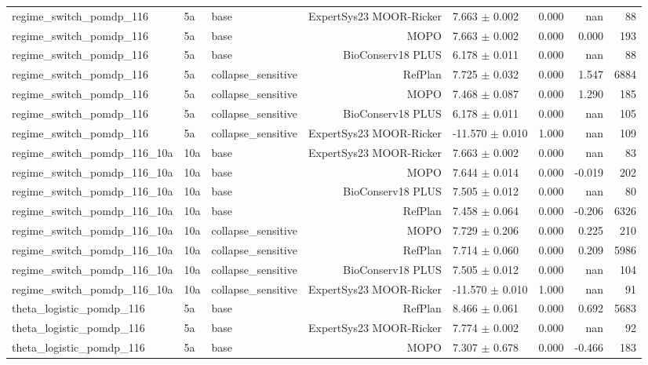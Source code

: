 \documentclass{article}
\begin{document}
\begin{longtable}{lllrlrrr}
regime\_switch\_pomdp\_116 & 5a & base & ExpertSys23 MOOR-Ricker & 7.663 $\pm$ 0.002 & 0.000 & nan & 88 \\
regime\_switch\_pomdp\_116 & 5a & base & MOPO & 7.663 $\pm$ 0.002 & 0.000 & 0.000 & 193 \\
regime\_switch\_pomdp\_116 & 5a & base & BioConserv18 PLUS & 6.178 $\pm$ 0.011 & 0.000 & nan & 88 \\
regime\_switch\_pomdp\_116 & 5a & collapse\_sensitive & RefPlan & 7.725 $\pm$ 0.032 & 0.000 & 1.547 & 6884 \\
regime\_switch\_pomdp\_116 & 5a & collapse\_sensitive & MOPO & 7.468 $\pm$ 0.087 & 0.000 & 1.290 & 185 \\
regime\_switch\_pomdp\_116 & 5a & collapse\_sensitive & BioConserv18 PLUS & 6.178 $\pm$ 0.011 & 0.000 & nan & 105 \\
regime\_switch\_pomdp\_116 & 5a & collapse\_sensitive & ExpertSys23 MOOR-Ricker & -11.570 $\pm$ 0.010 & 1.000 & nan & 109 \\
regime\_switch\_pomdp\_116\_10a & 10a & base & ExpertSys23 MOOR-Ricker & 7.663 $\pm$ 0.002 & 0.000 & nan & 83 \\
regime\_switch\_pomdp\_116\_10a & 10a & base & MOPO & 7.644 $\pm$ 0.014 & 0.000 & -0.019 & 202 \\
regime\_switch\_pomdp\_116\_10a & 10a & base & BioConserv18 PLUS & 7.505 $\pm$ 0.012 & 0.000 & nan & 80 \\
regime\_switch\_pomdp\_116\_10a & 10a & base & RefPlan & 7.458 $\pm$ 0.064 & 0.000 & -0.206 & 6326 \\
regime\_switch\_pomdp\_116\_10a & 10a & collapse\_sensitive & MOPO & 7.729 $\pm$ 0.206 & 0.000 & 0.225 & 210 \\
regime\_switch\_pomdp\_116\_10a & 10a & collapse\_sensitive & RefPlan & 7.714 $\pm$ 0.060 & 0.000 & 0.209 & 5986 \\
regime\_switch\_pomdp\_116\_10a & 10a & collapse\_sensitive & BioConserv18 PLUS & 7.505 $\pm$ 0.012 & 0.000 & nan & 104 \\
regime\_switch\_pomdp\_116\_10a & 10a & collapse\_sensitive & ExpertSys23 MOOR-Ricker & -11.570 $\pm$ 0.010 & 1.000 & nan & 91 \\
theta\_logistic\_pomdp\_116 & 5a & base & RefPlan & 8.466 $\pm$ 0.061 & 0.000 & 0.692 & 5683 \\
theta\_logistic\_pomdp\_116 & 5a & base & ExpertSys23 MOOR-Ricker & 7.774 $\pm$ 0.002 & 0.000 & nan & 92 \\
theta\_logistic\_pomdp\_116 & 5a & base & MOPO & 7.307 $\pm$ 0.678 & 0.000 & -0.466 & 183 \\

\end{longtable}
\end{document}

